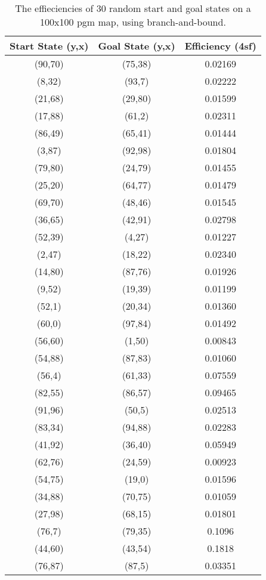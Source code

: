 \documentclass[11pt,oneside]{article}
\begin{document}
\begin{table}[ht]
    \centering
    \begin{tabular}{|c|c|c|}
	Start State (y,x)&Goal State (y,x)&Efficiency (4sf) \\ \hline
	(90,70)&(75,38)&0.02169 \\
	(8,32)	&(93,7)&0.02222 \\
	(21,68)&(29,80)&0.01599 \\
	(17,88)&(61,2)&0.02311 \\
	(86,49)&(65,41)&0.01444 \\
	(3,87)&(92,98)&0.01804 \\
	(79,80)&(24,79)&0.01455 \\
	(25,20)&(64,77)&0.01479 \\
	(69,70)&(48,46)&0.01545 \\
	(36,65)&(42,91)&0.02798 \\
	(52,39)&(4,27)&0.01227 \\
	(2,47)&(18,22)&0.02340 \\
	(14,80)&(87,76)&0.01926 \\
	(9,52)&(19,39)&0.01199 \\
	(52,1)&(20,34)&0.01360 \\
	(60,0)&(97,84)&0.01492 \\
	(56,60)&(1,50)&0.00843 \\
	(54,88)&(87,83)&0.01060 \\
	(56,4)&(61,33)&0.07559 \\
	(82,55)&(86,57)&0.09465 \\
	(91,96)&(50,5)&0.02513 \\
	(83,34)&(94,88)&0.02283 \\
	(41,92)&(36,40)&0.05949 \\
	(62,76)&(24,59)&0.00923 \\
	(54,75)&(19,0)&0.01596 \\
	(34,88)&(70,75)&0.01059 \\
	(27,98)&(68,15)&0.01801 \\
	(76,7)&(79,35)&0.1096 \\
	(44,60)&(43,54)&0.1818 \\
	(76,87)&(87,5)&0.03351 \\

    \end{tabular}
    \caption{The effieciencies of 30 random start and goal states on a 100x100 pgm map, using branch-and-bound.}
    \label{tab:bandbeff}
\end{table}
\end{document}
